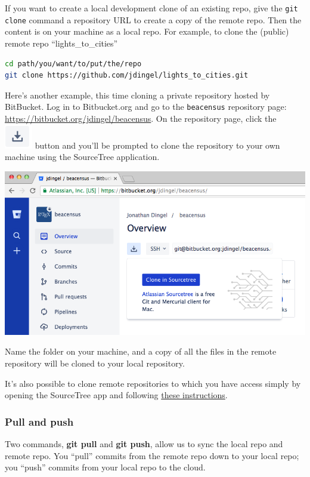 If you want to create a local development clone of an existing repo,
give the \texttt{git clone} command a repository URL to create a copy of the remote repo.
Then the content is on your machine as a local repo.
For example, to clone the (public) remote repo ``lights\_to\_cities''
\begin{lstlisting}[language=bash]
cd path/you/want/to/put/the/repo
git clone https://github.com/jdingel/lights_to_cities.git
\end{lstlisting}

Here's another example, this time cloning a private repository hosted by BitBucket.
Log in to Bitbucket.org and go to the \texttt{beacensus} repository page:
\url{https://bitbucket.org/jdingel/beacensus}.
On the repository page, click the
\includegraphics[width=.025\textwidth]{./figures/workflow/BitBucket_screeshot_cloneinsourcetree2.png}
button and you'll be prompted to clone the repository to your own machine using the SourceTree application.
\begin{center}
\includegraphics[width=.8\textwidth]{./figures/workflow/BitBucket_screeshot_cloneinsourcetree1.png}
\end{center}
Name the folder on your machine, and a copy of all the files in the remote repository will be cloned to your local repository.

It's also possible to clone remote repositories to which you have access simply by opening the SourceTree app and following \href{https://confluence.atlassian.com/get-started-with-sourcetree/clone-a-remote-repository-847359098.html}{these instructions}.

\subsubsection{Pull and push}

Two commands, \textbf{git pull} and \textbf{git push}, 
allow us to sync the local repo and remote repo.
You ``pull'' commits from the remote repo down to your local repo;
you ``push'' commits from your local repo to the cloud.


